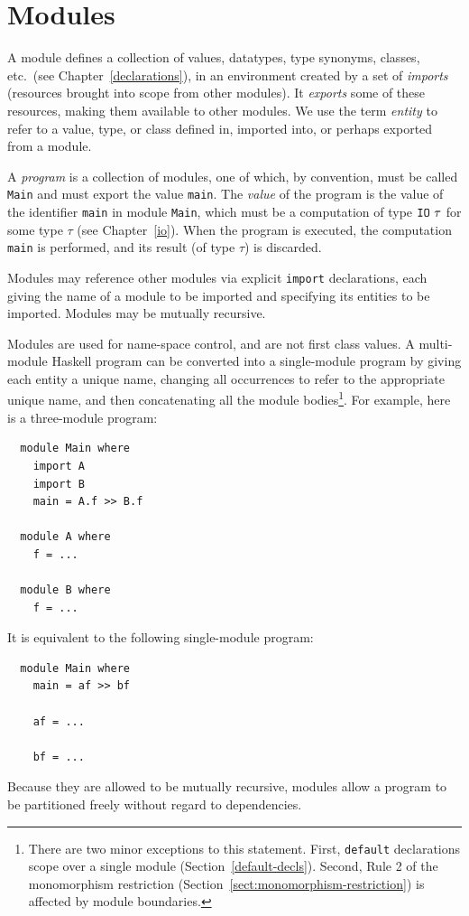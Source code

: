 %
%
\chapter{Modules} 
\label{modules} 

A module defines a collection of values, datatypes, type synonyms,
classes, etc.~(see Chapter~\ref{declarations}), in an environment created
by a set of {\em imports} (resources brought into scope from other modules).
It {\em exports} some of these resources, making them available to
other modules.  
We use the term {\em entity} to refer to
a value, type, or class defined in, imported into, or perhaps
exported from a module.

A \Haskell{} {\em program} is a collection of modules, one of
which, by convention, must be called \mbox{\tt Main} and must
export the value \mbox{\tt main}.  The {\em value} of the program
is the value of the identifier \mbox{\tt main} in module \mbox{\tt Main},
which must be a computation of type $\mbox{\tt IO}~\tau$ for some type $\tau$
(see Chapter~\ref{io}).  When the program is executed, the computation
\mbox{\tt main} is performed, and its result (of type $\tau$) is discarded.

Modules may reference other modules via explicit
\mbox{\tt import} declarations, each giving the name of a module to be
imported and specifying its entities to be imported.
Modules may be mutually recursive.

Modules are used for name-space control, and are not first class values.
A multi-module Haskell program can be converted into a single-module
program by giving each entity a unique name, changing all occurrences
to refer to the appropriate unique name, and then concatenating all the module
bodies\footnote{There are two minor exceptions to this statement.
First, \mbox{\tt default} declarations scope over a single module (Section~\ref{default-decls}).
Second, Rule 2 of the monomorphism restriction (Section~\ref{sect:monomorphism-restriction})
is affected by module boundaries.
}.  
For example, here is a three-module program:
\bprog
{\small\begin{verbatim}
  module Main where
    import A
    import B
    main = A.f >> B.f

  module A where
    f = ...

  module B where
    f = ...
\end{verbatim}}
\eprog
It is equivalent to the following single-module program:
\bprog
{\small\begin{verbatim}
  module Main where
    main = af >> bf

    af = ...

    bf = ...
\end{verbatim}}
\eprog
Because they are allowed to be mutually recursive,
modules allow a program to be partitioned freely without regard to
dependencies.

